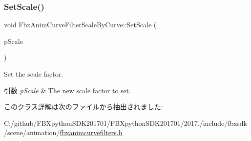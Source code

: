 \mbox{\label{class_fbx_anim_curve_filter_scale_by_curve_afe876ca9b9d674e62b9b7a3839adeef0}} 
\subsubsection{\texorpdfstring{Set\+Scale()}{SetScale()}}
{\footnotesize\ttfamily void Fbx\+Anim\+Curve\+Filter\+Scale\+By\+Curve\+::\+Set\+Scale (\begin{DoxyParamCaption}\item[{\hyperlink{class_fbx_anim_curve}{Fbx\+Anim\+Curve} $\ast$}]{p\+Scale }\end{DoxyParamCaption})}

Set the scale factor. 
\begin{DoxyParams}{引数}
{\em p\+Scale} & The new scale factor to set. \\
\hline
\end{DoxyParams}


このクラス詳解は次のファイルから抽出されました\+:\begin{DoxyCompactItemize}
\item 
C\+:/github/\+F\+B\+Xpython\+S\+D\+K201701/\+F\+B\+Xpython\+S\+D\+K201701/2017./include/fbxsdk/scene/animation/\hyperlink{fbxanimcurvefilters_8h}{fbxanimcurvefilters.\+h}\end{DoxyCompactItemize}

